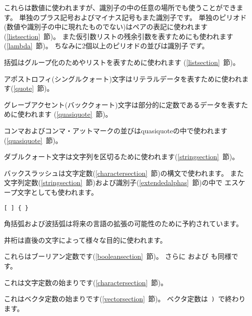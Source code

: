 \begin{description}{}{}

\item[{\tt.\ + -}]
これらは数値に使われますが、識別子の中の任意の場所でも使うことができます。
単独のプラス記号およびマイナス記号もまた識別子です。
単独のピリオド(数値や識別子の中に現れたものでない)はペアの表記に使われます(\ref{listsection}~節)。
また仮引数リストの残余引数を表すためにも使われます(\ref{lambda}~節)。
ちなみに2個以上のピリオドの並びは識別子{\em です}。

\item[\tt( )]
括弧はグループ化のためやリストを表すために使われます
(\ref{listsection}~節)。

\item[\singlequote]
アポストロフィ(シングルクォート)文字はリテラルデータを表すために使われます(\ref{quote}~節)。

\item[\backquote]
グレーブアクセント(バッククォート)文字は部分的に定数であるデータを表すために使われます
(\ref{quasiquote}~節)。

\item[\tt, ,@]
コンマおよびコンマ・アットマークの並びはquasiquoteの中で使われます(\ref{quasiquote}~節)。

\item[\tt"]
ダブルクォート文字は文字列を区切るために使われます(\ref{stringsection}~節)。

\item[\backwhack]
バックスラッシュは文字定数(\ref{charactersection}~節)の構文で使われます。
また文字列定数(\ref{stringsection}~節)および識別子(\ref{extendedalphas}~節)の中で
エスケープ文字としても使われます。

\hbox{\tt \verb"[" \verb"]" \verb"{" \verb"}"}
\item[\copy0]
角括弧および波括弧は将来の言語の拡張の可能性のために予約されています。

\item[\sharpsign]
井桁は直後の文字によって様々な目的に使われます。

\item[\schtrue{} \schfalse{}]
これらはブーリアン定数です(\ref{booleansection}~節)。
さらに および も同様です。

\item[\sharpsign\backwhack]
これは文字定数の始まりです(\ref{charactersection}~節)。

\item[\sharpsign\tt(]
これはベクタ定数の始まりです(\ref{vectorsection}~節)。
ベクタ定数は~{\tt)}~で終わります。


\end{description}
